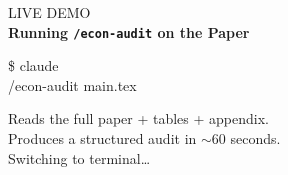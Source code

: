 \documentclass[aspectratio=169, 10pt]{beamer}
\begin{document}
{
\begin{frame}[plain]
\centering\vfill
{\color{UVMGold}\faTerminal\quad\fontsize{12}{14}\selectfont LIVE DEMO}\\[12pt]
{\fontsize{18}{22}\bfseries\selectfont\color{white} Running \texttt{/econ-audit} on the Paper}\\[16pt]
\begin{tcolorbox}[colback=DarkSlate!80, colframe=CoolGray!40, boxrule=0.5pt, arc=3pt,
  left=8pt, right=8pt, top=6pt, bottom=6pt, width=11cm]
{\color{CoolGray}\ttfamily\small\$\; claude}\\[4pt]
{\color{white}\ttfamily\small /econ-audit main.tex}
\end{tcolorbox}
\vskip16pt
{\small\color{CoolGray} Reads the full paper + tables + appendix.}\\[4pt]
{\small\color{CoolGray} Produces a structured audit in $\sim$60 seconds.}\\[8pt]
{\small\color{PaleSage} \faPlay\; Switching to terminal\ldots}
\vfill
\end{frame}
}
\end{document}
